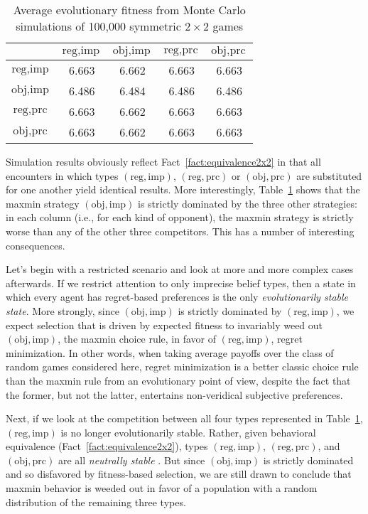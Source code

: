 \documentclass[fleqn,reqno,11pt]{article}
\begin{document}
\begin{table}[t]
\centering
\begin{tabular}{ccccc}
  \toprule
 & $\text{reg}, \text{imp}$ 
 & $\text{obj}, \text{imp}$ 
 & $\text{reg}, \text{prc}$ 
 & $\text{obj}, \text{prc}$ \\ 
  \midrule
  $\text{reg}, \text{imp}$ & 6.663 & 6.662 & 6.663 & 6.663 \\ 
  $\text{obj}, \text{imp}$ & 6.486 & 6.484 & 6.486 & 6.486 \\ 
  $\text{reg}, \text{prc}$ & 6.663 & 6.662 & 6.663 & 6.663 \\  
  $\text{obj}, \text{prc}$ & 6.663 & 6.662 & 6.663 & 6.663 \\ 
   \bottomrule
\end{tabular}                    
\caption{Average evolutionary fitness from Monte Carlo simulations of 100,000 symmetric $2 \times 2$ games}
\label{tab:ExpectedFitness_4Types}
\end{table}

Simulation results obviously reflect Fact~\ref{fact:equivalence2x2} in that all encounters in
which types $(\text{reg}, \text{imp})$, $(\text{reg}, \text{prc})$ or
$(\text{obj}, \text{prc})$ are substituted for one another yield identical results. More
interestingly, Table~\ref{tab:ExpectedFitness_4Types} shows that the maxmin strategy
$(\text{obj}, \text{imp})$ is strictly dominated by the three other strategies: in each column
(i.e., for each kind of opponent), the maxmin strategy is strictly worse than any of the other
three competitors. This has a number of interesting consequences.

Let's begin with a restricted scenario and look at more and more complex cases afterwards. If
we restrict attention to only imprecise belief types, then a state in which every agent has
regret-based preferences is the only \emph{evolutionarily stable state}. More strongly, since
$(\text{obj}, \text{imp})$ is strictly dominated by $(\text{reg}, \text{imp})$, we expect
selection that is driven by expected fitness to invariably weed out $(\text{obj}, \text{imp})$,
the maxmin choice rule, in favor of $(\text{reg}, \text{imp})$, regret minimization. In other
words, when taking average payoffs over the class of random games considered here, regret
minimization is a better classic choice rule than the maxmin rule from an evolutionary point of
view, despite the fact that the former, but not the latter, entertains non-veridical subjective
preferences.

Next, if we look at the competition between all four types represented in
Table~\ref{tab:ExpectedFitness_4Types}, $(\text{reg}, \text{imp})$ is no longer evolutionarily
stable. Rather, given behavioral equivalence (Fact~\ref{fact:equivalence2x2}), types
$(\text{reg}, \text{imp})$, $(\text{reg}, \text{prc})$, and $(\text{obj}, \text{prc})$ are all
\emph{neutrally stable} \citep{Maynard-Smith1982:Evolution-and-t}. But since
$(\text{obj}, \text{imp})$ is strictly dominated and so disfavored by fitness-based selection,
we are still drawn to conclude that maxmin behavior is weeded out in favor of a population with
a random distribution of the remaining three types.
\end{document}
